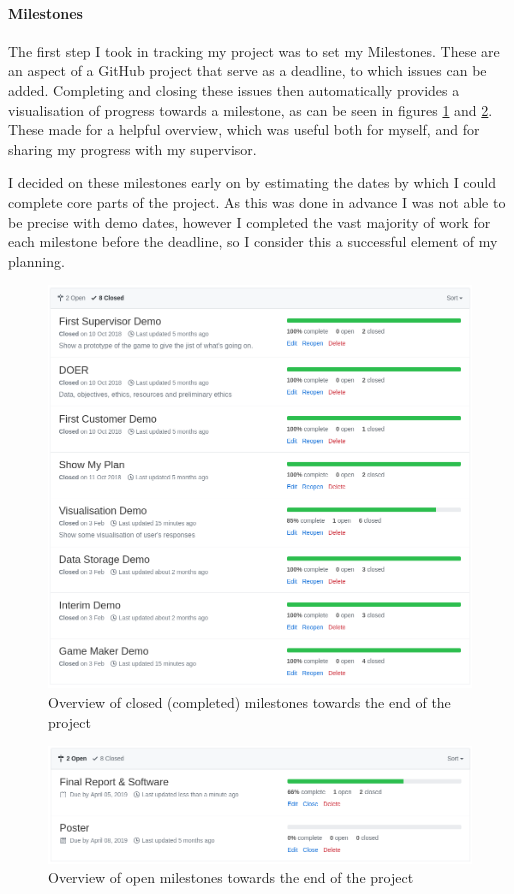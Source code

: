 \paragraph{Milestones} The first step I took in tracking my project was to set my Milestones. These are an aspect of a GitHub project that serve as a deadline, to which issues can be added. 
Completing and closing these issues then automatically provides a visualisation of progress towards a milestone, as can be seen in figures \ref{fig:closed_milestones} and \ref{fig:open_milestones}. 
These made for a helpful overview, which was useful both for myself, and for sharing my progress with my supervisor.

I decided on these milestones early on by estimating the dates by which I could complete core parts of the project. As this was done in advance I was not able to be precise with demo dates, however I completed the vast majority of work for each milestone before the deadline, so I consider this a successful element of my planning.

\begin{figure}[!h]
	\centering
	\includegraphics[width=1.0\textwidth]{./images/softeng/closed_milestones.png}
	\caption{Overview of closed (completed) milestones towards the end of the project}
	\label{fig:closed_milestones}
\end{figure}

\begin{figure}[!h]
	\centering
	\includegraphics[width=1.0\textwidth]{./images/softeng/open_milestones.png}
	\caption{Overview of open milestones towards the end of the project}
	\label{fig:open_milestones}
\end{figure}

